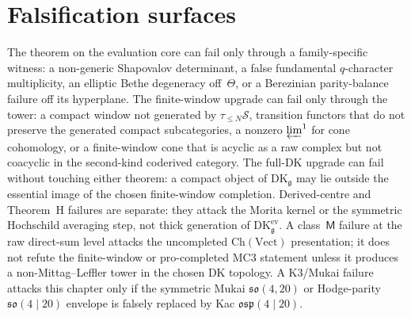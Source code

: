 \section{Falsification surfaces}
\label{sec:mc3-platonic-falsification-surfaces}

\begin{remark}
\label{rem:mc3-boundary-falsification}
%
The theorem on the evaluation core can fail only through a
family-specific witness: a non-generic Shapovalov determinant, a false
fundamental $q$-character multiplicity, an elliptic Bethe degeneracy
off~$\Theta$, or a Berezinian parity-balance failure off its hyperplane.
The finite-window upgrade can fail only through the tower: a compact
window not generated by $\tau_{\le N}\mathcal S$, transition functors
that do not preserve the generated compact subcategories, a nonzero
$\varprojlim^1$ for cone cohomology, or a finite-window cone that is
acyclic as a raw complex but not coacyclic in the second-kind coderived
category. The full-DK upgrade can fail without touching either theorem:
a compact object of $\mathrm{DK}_\mathfrak g$ may lie outside the
essential image of the chosen finite-window completion. Derived-centre
and Theorem~H failures are separate: they attack the Morita kernel or
the symmetric Hochschild averaging step, not thick generation of
$\mathrm{DK}^{\mathrm{ev}}_\mathfrak g$. A class~$\mathsf M$ failure
at the raw direct-sum level attacks the uncompleted
$\mathrm{Ch}(\mathrm{Vect})$ presentation; it does not refute the
finite-window or pro-completed MC3 statement unless it produces a
non-Mittag--Leffler tower in the chosen DK topology.  A K3/Mukai
failure attacks this chapter only if the symmetric Mukai
$\mathfrak{so}(4,20)$ or Hodge-parity $\mathfrak{so}(4\mid20)$
envelope is falsely replaced by Kac $\mathfrak{osp}(4\mid20)$.
\end{remark}

